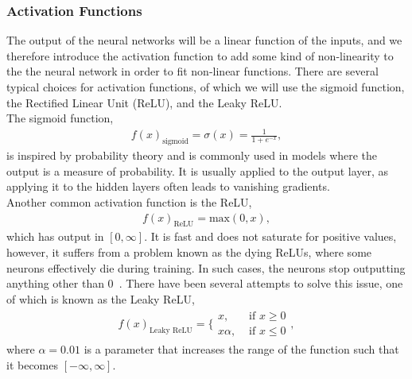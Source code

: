 \documentclass[english,notitlepage,reprint,nofootinbib]{revtex4–2}  %
\begin{document}
\subsubsection{Activation Functions}%
The output of the neural networks will be a linear function of the inputs, and we therefore introduce the activation function to add some kind of non-linearity to the the neural network in order to fit non-linear functions. 
There are several typical choices for activation functions, of which we will use the sigmoid function, the Rectified Linear Unit (ReLU), and the Leaky ReLU. 
\vspace{3mm}
\\ 
The sigmoid function, 
\begin{align}
    f(x)_\text{sigmoid} = \sigma(x) = \frac{1}{1+e^{−x}},
\end{align}
is inspired by probability theory and is commonly used in models where the output is a measure of probability. It is usually applied to the output layer, as applying it to the hidden layers often leads to vanishing gradients. 
\vspace{3mm}
\\ 
Another common activation function is the ReLU, 
\begin{align}
    f(x)_\text{ReLU} = \text{max}(0, x), 
\end{align}
which has output in $[0,\infty]$. It is fast and does not saturate for positive values, however, it suffers from a problem known as the dying ReLUs, where some neurons effectively die during training. In such cases, the neurons stop outputting anything other than 0~\cite{lecture_notes}. There have been several attempts to solve this issue, one of which is known as the Leaky ReLU, 
\begin{align}
    f(x)_\text{Leaky ReLU} = \bigg\{ 
    \begin{matrix}
        x,       & \text{ if } x \geq 0 \\ 
        x\alpha, & \text{ if } x \leq 0 
    \end{matrix}, 
\end{align}
where $\alpha=0.01$ is a parameter that increases the range of the function such that it becomes $[-\infty, \infty]$. 
\end{document}
